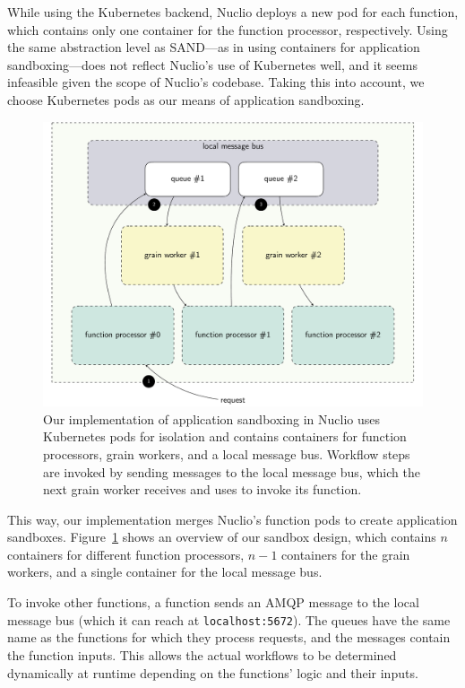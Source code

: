 While using the Kubernetes backend, Nuclio deploys a new pod for each function, which contains only one container for the function processor, respectively.
Using the same abstraction level as SAND—as in using containers for application sandboxing—does not reflect Nuclio's use of Kubernetes well, and it seems infeasible given the scope of Nuclio's codebase. 
Taking this into account, we choose Kubernetes pods as our means of application sandboxing.

\begin{figure}[!h]
    \centering
    \includegraphics[width=\linewidth]{figures/sandbox.pdf}
    \caption{
        Our implementation of application sandboxing in Nuclio uses Kubernetes pods for isolation and contains containers for function processors, grain workers, and a local message bus. 
        Workflow steps are invoked by sending messages to the local message bus, which the next grain worker receives and uses to invoke its function.
    }\label{fig:sandbox}
\end{figure}

This way, our implementation merges Nuclio's function pods to create application sandboxes. Figure~\ref{fig:sandbox} shows an overview of our sandbox design, which contains $n$ containers for different function processors, $n-1$ containers for the grain workers, and a single container for the local message bus.

To invoke other functions, a function sends an AMQP message to the local message bus (which it can reach at \texttt{localhost:5672}). 
The queues have the same name as the functions for which they process requests, and the messages contain the function inputs. 
This allows the actual workflows to be determined dynamically at runtime depending on the functions' logic and their inputs.

